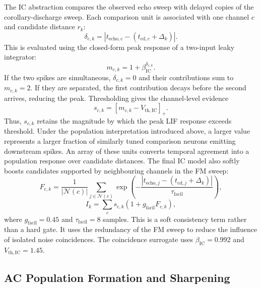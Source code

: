 The IC abstraction compares the observed echo sweep with delayed copies of the corollary-discharge sweep. Each comparison unit is associated with one channel $c$ and candidate distance $r_k$:
\begin{equation}
    \delta_{c,k}
    =
    \left|
    t_{\mathrm{echo},c}
    -
    (t_{\mathrm{cd},c}+\Delta_k)
    \right|.
\end{equation}
This is evaluated using the closed-form peak response of a two-input leaky integrator:
\begin{equation}
    m_{c,k}
    =
    1+\beta_{\mathrm{IC}}^{\delta_{c,k}}.
\end{equation}
If the two spikes are simultaneous, $\delta_{c,k}=0$ and their contributions sum to $m_{c,k}=2$. If they are separated, the first contribution decays before the second arrives, reducing the peak. Thresholding gives the channel-level evidence
\begin{equation}
    s_{c,k}
    =
    \left[
    m_{c,k}
    -
    V_{\mathrm{th,IC}}
    \right]_+.
\end{equation}
Thus, $s_{c,k}$ retains the magnitude by which the peak LIF response exceeds threshold. Under the population interpretation introduced above, a larger value represents a larger fraction of similarly tuned comparison neurons emitting downstream spikes. An array of these units converts temporal agreement into a population response over candidate distances. The final IC model also softly boosts candidates supported by neighbouring channels in the FM sweep:
\begin{equation}
    F_{c,k}
    =
    \frac{1}{|\mathcal{N}(c)|}
    \sum_{j \in \mathcal{N}(c)}
    \exp
    \left(
    -\frac{
    |t_{\mathrm{echo},j}-(t_{\mathrm{cd},j}+\Delta_k)|
    }{\tau_{\mathrm{facil}}}
    \right),
\end{equation}
\begin{equation}
    I_k
    =
    \sum_c s_{c,k}
    \left(1+g_{\mathrm{facil}}F_{c,k}\right),
\end{equation}
where $g_{\mathrm{facil}}=0.45$ and $\tau_{\mathrm{facil}}=8$ samples. This is a soft consistency term rather than a hard gate. It uses the redundancy of the FM sweep to reduce the influence of isolated noise coincidences.
The coincidence surrogate uses $\beta_{\mathrm{IC}}=0.992$ and $V_{\mathrm{th,IC}}=1.45$.

\subsection{AC Population Formation and Sharpening}

